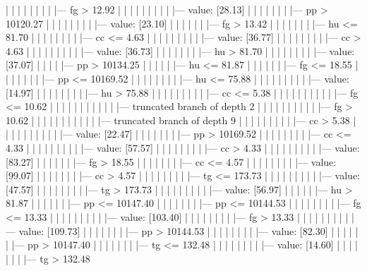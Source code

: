 \documentclass[UTF8, a4paper]{ctexart}
\begin{document}
|   |   |   |   |   |   |   |   |--- fg >  12.92
|   |   |   |   |   |   |   |   |   |--- value: [28.13]
|   |   |   |   |   |   |   |--- pp >  10120.27
|   |   |   |   |   |   |   |   |--- value: [23.10]
|   |   |   |   |   |   |--- fg >  13.42
|   |   |   |   |   |   |   |--- hu <= 81.70
|   |   |   |   |   |   |   |   |--- cc <= 4.63
|   |   |   |   |   |   |   |   |   |--- value: [36.77]
|   |   |   |   |   |   |   |   |--- cc >  4.63
|   |   |   |   |   |   |   |   |   |--- value: [36.73]
|   |   |   |   |   |   |   |--- hu >  81.70
|   |   |   |   |   |   |   |   |--- value: [37.07]
|   |   |   |   |--- pp >  10134.25
|   |   |   |   |   |--- hu <= 81.87
|   |   |   |   |   |   |--- fg <= 18.55
|   |   |   |   |   |   |   |--- pp <= 10169.52
|   |   |   |   |   |   |   |   |--- hu <= 75.88
|   |   |   |   |   |   |   |   |   |--- value: [14.97]
|   |   |   |   |   |   |   |   |--- hu >  75.88
|   |   |   |   |   |   |   |   |   |--- cc <= 5.38
|   |   |   |   |   |   |   |   |   |   |--- fg <= 10.62
|   |   |   |   |   |   |   |   |   |   |   |--- truncated branch of depth 2
|   |   |   |   |   |   |   |   |   |   |--- fg >  10.62
|   |   |   |   |   |   |   |   |   |   |   |--- truncated branch of depth 9
|   |   |   |   |   |   |   |   |   |--- cc >  5.38
|   |   |   |   |   |   |   |   |   |   |--- value: [22.47]
|   |   |   |   |   |   |   |--- pp >  10169.52
|   |   |   |   |   |   |   |   |--- cc <= 4.33
|   |   |   |   |   |   |   |   |   |--- value: [57.57]
|   |   |   |   |   |   |   |   |--- cc >  4.33
|   |   |   |   |   |   |   |   |   |--- value: [83.27]
|   |   |   |   |   |   |--- fg >  18.55
|   |   |   |   |   |   |   |--- cc <= 4.57
|   |   |   |   |   |   |   |   |--- value: [99.07]
|   |   |   |   |   |   |   |--- cc >  4.57
|   |   |   |   |   |   |   |   |--- tg <= 173.73
|   |   |   |   |   |   |   |   |   |--- value: [47.57]
|   |   |   |   |   |   |   |   |--- tg >  173.73
|   |   |   |   |   |   |   |   |   |--- value: [56.97]
|   |   |   |   |   |--- hu >  81.87
|   |   |   |   |   |   |--- pp <= 10147.40
|   |   |   |   |   |   |   |--- pp <= 10144.53
|   |   |   |   |   |   |   |   |--- fg <= 13.33
|   |   |   |   |   |   |   |   |   |--- value: [103.40]
|   |   |   |   |   |   |   |   |--- fg >  13.33
|   |   |   |   |   |   |   |   |   |--- value: [109.73]
|   |   |   |   |   |   |   |--- pp >  10144.53
|   |   |   |   |   |   |   |   |--- value: [82.30]
|   |   |   |   |   |   |--- pp >  10147.40
|   |   |   |   |   |   |   |--- tg <= 132.48
|   |   |   |   |   |   |   |   |--- value: [14.60]
|   |   |   |   |   |   |   |--- tg >  132.48
\end{document}
